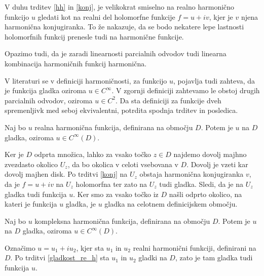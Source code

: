 \documentclass[mat1, tisk]{fmfdelo}
\begin{document}
    V duhu trditev \ref{hh} in \ref{konj}, je velikokrat smiselno na realno harmonično funkcijo $u$ gledati kot na realni del holomorfne funkcije $f = u + iv$, kjer je $v$ njena harmonična konjugiranka. To že nakazuje, da se bodo nekatere lepe lastnosti holomorfnih funkcij prenesle tudi na harmonične funkcije.
    
    Opazimo tudi, da je zaradi linearnosti parcialnih odvodov tudi linearna kombinacija harmoničnih funkcij harmonična. 

    \begin{opomba}
        V literaturi se v definiciji harmoničnosti, za funkcijo $u$, pojavlja tudi zahteva, da je funkcija gladka oziroma $u \in C^{\infty}$. V zgornji definiciji zahtevamo le obstoj drugih parcialnih odvodov, oziroma $u \in C^2$. 
        Da sta definiciji za funkcije dveh spremenljivk med seboj ekvivalentni, potrdita spodnja trditev in posledica. 
    \end{opomba}
    \begin{trditev}
        \label{gladkost_re_h}
        Naj bo $u$ realna harmonična funkcija, definirana na območju $D$. Potem je $u$ na $D$ gladka, oziroma $u \in C^{\infty}(D)$. 
    \end{trditev}
    \begin{dokaz}
        Ker je  $D$ odprta množica, lahko za vsako točko $z \in D$ najdemo dovolj majhno zvezdasto okolico $U_z$, da bo okolica v celoti vsebovana v $D$. Dovolj je vzeti kar dovolj majhen disk. 
        Po trditvi \ref{konj} na $U_z$ obstaja harmonična konjugiranka $v$, da je $f = u+ iv$ na $U_z$ holomorfna ter zato na $U_z$ tudi gladka. Sledi, da je na $U_z$ gladka tudi funkcija $u$.
        Ker smo za vsako točko iz $D$ našli odprto okolico, na kateri je funkcija $u$ gladka, je $u$ gladka na celotnem definicijskem območju.
    \end{dokaz}
    \begin{posledica}
        \label{gladkost_komp_h}
        Naj bo $u$ kompleksna harmonična funkcija, definirana na območju $D$. Potem je $u$ na $D$ gladka, oziroma $u \in C^{\infty}(D)$. 
    \end{posledica}
    \begin{dokaz}
        Označimo $u = u_1 + i u_2$, kjer sta $u_1$ in $u_2$ realni harmonični funkciji, definirani na $D$. Po trditvi \ref{gladkost_re_h} sta $u_1$ in $u_2$ gladki na $D$, zato je tam gladka tudi funkcija $u$.
    \end{dokaz}
\end{document}
